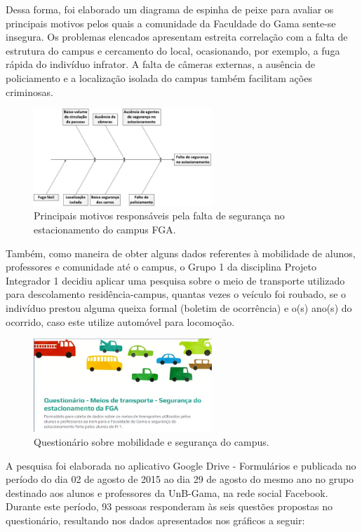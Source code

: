 Dessa forma, foi elaborado um diagrama de espinha de peixe para avaliar os principais motivos pelos quais a comunidade da Faculdade do Gama sente-se insegura. Os problemas elencados apresentam estreita correlação com a falta de estrutura do campus e cercamento do local, ocasionando, por exemplo, a fuga rápida do indivíduo infrator. A falta de câmeras externas, a ausência de policiamento e a localização isolada do campus também facilitam ações criminosas.

\begin{figure}[H]
	\centering
	\includegraphics[width=0.6\textwidth]{figuras/fishbone}
	\caption{Principais motivos responsáveis pela falta de segurança no estacionamento do campus FGA.}
	\label{img:fishbone}
\end{figure}

Também, como maneira de obter alguns dados referentes à mobilidade de alunos, professores e comunidade até o campus, o Grupo 1 da disciplina Projeto Integrador 1 decidiu aplicar uma pesquisa sobre o meio de transporte utilizado para descolamento residência-campus,   quantas vezes o veículo foi roubado, se o indivíduo prestou alguma queixa formal (boletim de ocorrência) e o(s) ano(s) do ocorrido, caso este utilize automóvel para locomoção.

\begin{figure}[H]
	\centering
	\includegraphics[width=0.6\textwidth]{figuras/questionario}
	\caption{Questionário sobre mobilidade e segurança do campus.}
	\label{img:questionario}
\end{figure}

A pesquisa foi elaborada no aplicativo Google Drive - Formulários e publicada no período do dia 02 de agosto de 2015 ao dia 29 de agosto do mesmo ano no grupo destinado aos alunos e professores da UnB-Gama, na rede social Facebook. Durante este período, 93 pessoas responderam às seis questões propostas no questionário, resultando nos dados apresentados nos gráficos a seguir:

